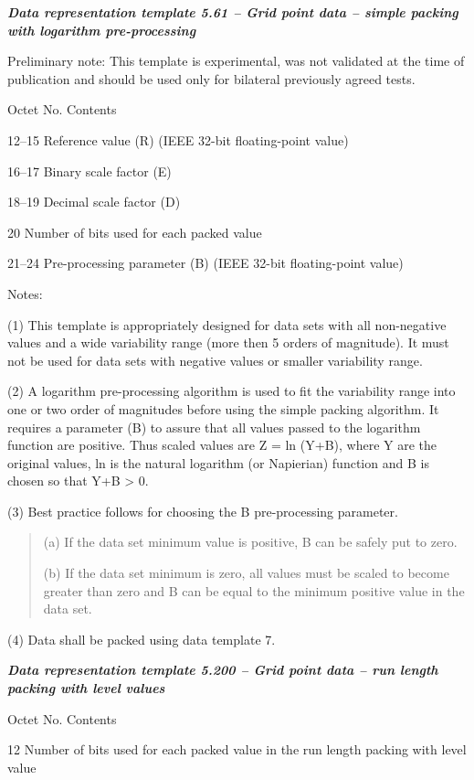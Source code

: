 \emph{\textbf{Data representation template 5.61 -- Grid point data -- simple packing with logarithm pre-processing}}

Preliminary note: This template is experimental, was not validated at the time of publication and should be used only for bilateral previously agreed tests.

Octet No. Contents

12--15 Reference value (R) (IEEE 32-bit floating-point value)

16--17 Binary scale factor (E)

18--19 Decimal scale factor (D)

20 Number of bits used for each packed value

21--24 Pre-processing parameter (B) (IEEE 32-bit floating-point value)

Notes:

(1) This template is appropriately designed for data sets with all non-negative values and a wide variability range (more then 5 orders of magnitude). It must not be used for data sets with negative values or smaller variability range.

(2) A logarithm pre-processing algorithm is used to fit the variability range into one or two order of magnitudes before using the simple packing algorithm. It requires a parameter (B) to assure that all values passed to the logarithm function are positive. Thus scaled values are Z = ln (Y+B), where Y are the original values, ln is the natural logarithm (or Napierian) function and B is chosen so that Y+B \textgreater{} 0.

(3) Best practice follows for choosing the B pre-processing parameter.

\begin{quote}
(a) If the data set minimum value is positive, B can be safely put to zero.

(b) If the data set minimum is zero, all values must be scaled to become greater than zero and B can be equal to the minimum positive value in the data set.
\end{quote}

(4) Data shall be packed using data template 7.

\emph{\textbf{Data representation template 5.200 -- Grid point data -- run length packing with level values}}

Octet No. Contents

12 Number of bits used for each packed value in the run length packing with level value

